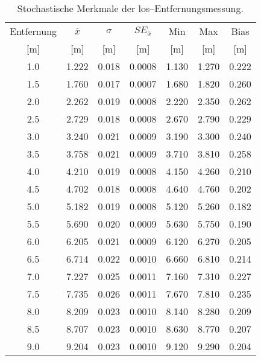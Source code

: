 \begin{appendices}

\begin{table}[h]
	\centering
	\begin{tabular}{||c||ccc||cc||c||}
\hline
Entfernung & $\overline{x}$ & $\sigma$ & $SE_{\overline{x}}$ & Min & Max & Bias \\
{[}\si{\meter}{]} & {[}\si{\meter}{]} & {[}\si{\meter}{]} & {[}\si{\meter}{]} & {[}\si{\meter}{]} & {[}\si{\meter}{]} & {[}\si{\meter}{]} \\
\hline
\hline
\num{1.0} & \num{1.222} & \num{0.018} & \num{0.0008} & \num{1.130} & \num{1.270} & \num{0.222} \\
\num{1.5} & \num{1.760} & \num{0.017} & \num{0.0007} & \num{1.680} & \num{1.820} & \num{0.260} \\
\num{2.0} & \num{2.262} & \num{0.019} & \num{0.0008} & \num{2.220} & \num{2.350} & \num{0.262} \\
\num{2.5} & \num{2.729} & \num{0.018} & \num{0.0008} & \num{2.670} & \num{2.790} & \num{0.229} \\
\num{3.0} & \num{3.240} & \num{0.021} & \num{0.0009} & \num{3.190} & \num{3.300} & \num{0.240} \\
\num{3.5} & \num{3.758} & \num{0.021} & \num{0.0009} & \num{3.710} & \num{3.810} & \num{0.258} \\
\num{4.0} & \num{4.210} & \num{0.019} & \num{0.0008} & \num{4.150} & \num{4.260} & \num{0.210} \\
\num{4.5} & \num{4.702} & \num{0.018} & \num{0.0008} & \num{4.640} & \num{4.760} & \num{0.202} \\
\num{5.0} & \num{5.182} & \num{0.019} & \num{0.0008} & \num{5.120} & \num{5.260} & \num{0.182} \\
\num{5.5} & \num{5.690} & \num{0.020} & \num{0.0009} & \num{5.630} & \num{5.750} & \num{0.190} \\
\num{6.0} & \num{6.205} & \num{0.021} & \num{0.0009} & \num{6.120} & \num{6.270} & \num{0.205} \\
\num{6.5} & \num{6.714} & \num{0.022} & \num{0.0010} & \num{6.660} & \num{6.810} & \num{0.214} \\
\num{7.0} & \num{7.227} & \num{0.025} & \num{0.0011} & \num{7.160} & \num{7.310} & \num{0.227} \\
\num{7.5} & \num{7.735} & \num{0.026} & \num{0.0011} & \num{7.670} & \num{7.810} & \num{0.235} \\
\num{8.0} & \num{8.209} & \num{0.023} & \num{0.0010} & \num{8.140} & \num{8.280} & \num{0.209} \\
\num{8.5} & \num{8.707} & \num{0.023} & \num{0.0010} & \num{8.630} & \num{8.770} & \num{0.207} \\
\num{9.0} & \num{9.204} & \num{0.023} & \num{0.0010} & \num{9.120} & \num{9.290} & \num{0.204} \\
\hline
	\end{tabular}
	\caption{Stochastische Merkmale der \Gls{los}--Entfernungsmessung.}
	\label{tab:entfernungsmessung_2018_01_20_los}
\end{table}


\end{appendices}
